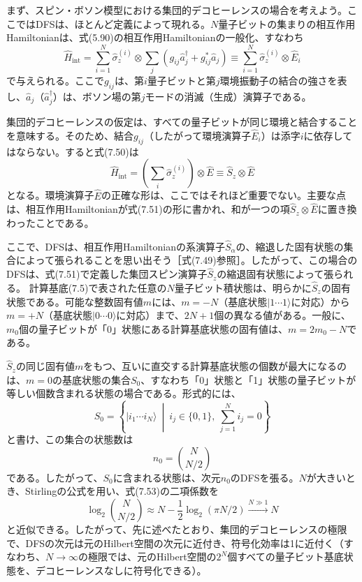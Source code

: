 まず、スピン・ボソン模型における集団的デコヒーレンスの場合を考えよう\cite{ref089,ref091,ref093,ref096,ref237}。ここではDFSは、ほとんど定義によって現れる。$N$量子ビットの集まりの相互作用Hamiltonianは、式(5.90)の相互作用Hamiltonianの一般化、すなわち
\begin{equation}\hat H_{\mathrm{int}}=\sum_{i=1}^N\hat\sigma_z^{(i)}\otimes\sum_j(g_{ij}\hat a_j^\dagger+g_{ij}^{*}\hat a_j)\equiv\sum_{i=1}^N\hat\sigma_z^{(i)}\otimes\hat E_i\tag{7.50}\end{equation}
で与えられる。ここで$g_{ij}$は、第$i$量子ビットと第$j$環境振動子の結合の強さを表し、$\hat a_j$（$\hat a_j^\dagger$）は、ボソン場の第$j$モードの消滅（生成）演算子である。

集団的デコヒーレンスの仮定は、すべての量子ビットが同じ環境と結合することを意味する。そのため、結合$g_{ij}$（したがって環境演算子$\hat E_i$）は添字$i$に依存してはならない。すると式(7.50)は
\begin{equation}\hat H_{\mathrm{int}}=\left(\sum_i\hat\sigma_z^{(i)}\right)\otimes\hat E\equiv\hat S_z\otimes\hat E\tag{7.51}\end{equation}
となる。環境演算子$\hat E$の正確な形は、ここではそれほど重要でない。主要な点は、相互作用Hamiltonianが式(7.51)の形に書かれ、和が一つの項$\hat S_z\otimes\hat E$に置き換わったことである。

ここで、DFSは、相互作用Hamiltonianの系演算子$\hat S_\alpha$の、縮退した固有状態の集合によって張られることを思い出そう［式(7.49)参照］。したがって、この場合のDFSは、式(7.51)で定義した集団スピン演算子$\hat S_z$の縮退固有状態によって張られる。
\hypertarget{srcpage:324}{}\label{srcpage:324}
計算基底(7.5)で表された任意の$N$量子ビット積状態は、明らかに$\hat S_z$の固有状態である。可能な整数固有値$m$には、$m=-N$（基底状態$|1\cdots1\rangle$に対応）から$m=+N$（基底状態$|0\cdots0\rangle$に対応）まで、$2N+1$個の異なる値がある。一般に、$m_0$個の量子ビットが「0」状態にある計算基底状態の固有値は、$m=2m_0-N$である。

$\hat S_z$の同じ固有値$m$をもつ、互いに直交する計算基底状態の個数が最大になるのは、$m=0$の基底状態の集合$S_0$、すなわち「0」状態と「1」状態の量子ビットが等しい個数含まれる状態の場合である。形式的には、
\begin{equation}S_0=\left\{|i_1\cdots i_N\rangle\ \middle|\ i_j\in\{0,1\},\ \sum_{j=1}^N i_j=0\right\}\tag{7.52}\end{equation}
と書け、この集合の状態数は
\begin{equation}n_0=\binom{N}{N/2}\tag{7.53}\end{equation}
である。したがって、$S_0$に含まれる状態は、次元$n_0$のDFSを張る。$N$が大きいとき、Stirlingの公式を用い、式(7.53)の二項係数を
\begin{equation}\log_2\binom{N}{N/2}\approx N-\frac12\log_2(\pi N/2)\xrightarrow{N\gg1}N\tag{7.54}\end{equation}
と近似できる。したがって、先に述べたとおり、集団的デコヒーレンスの極限で、DFSの次元は元のHilbert空間の次元に近付き、符号化効率は1に近付く（すなわち、$N\longrightarrow\infty$の極限では、元のHilbert空間の$2^N$個すべての量子ビット基底状態を、デコヒーレンスなしに符号化できる）。

